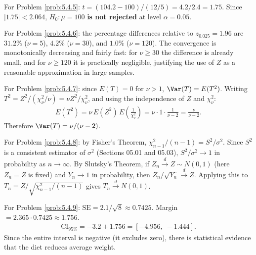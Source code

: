 \begin{solucion}
	\label{sol:5.4.5}
	For Problem \ref{prob:5.4.5}: $t = (104.2-100)/(12/5) = 4.2/2.4 = 1.75$. Since $|1.75| < 2.064$, $H_0:\mu=100$ \textbf{is not rejected} at level $\alpha=0.05$. \quad \qedhere
\end{solucion}

\begin{solucion}
	\label{sol:5.4.6}
	For Problem \ref{prob:5.4.6}: the percentage differences relative to $z_{0.025}=1.96$ are $31.2\%$ ($\nu=5$), $4.2\%$ ($\nu=30$), and $1.0\%$ ($\nu=120$). The convergence is monotonically decreasing and fairly fast: for $\nu\ge 30$ the difference is already small, and for $\nu\ge 120$ it is practically negligible, justifying the use of $Z$ as a reasonable approximation in large samples. \quad \qedhere
\end{solucion}

\begin{solucion}
	\label{sol:5.4.7}
	For Problem \ref{prob:5.4.7}: since $E(T)=0$ for $\nu>1$, $\Var(T)=E(T^2)$. Writing $T^2 = Z^2/(\chi^2_\nu/\nu) = \nu Z^2/\chi^2_\nu$, and using the independence of $Z$ and $\chi^2_\nu$:
	\begin{align*}
		E(T^2) = \nu\, E(Z^2)\, E\!\left(\frac{1}{\chi^2_\nu}\right) = \nu \cdot 1 \cdot \frac{1}{\nu-2} = \frac{\nu}{\nu-2}.
	\end{align*}
	Therefore $\Var(T) = \nu/(\nu-2)$. \quad \qedhere
\end{solucion}

\begin{solucion}
	\label{sol:5.4.8}
	For Problem \ref{prob:5.4.8}: by Fisher's Theorem, $\chi^2_{n-1}/(n-1) = S^2/\sigma^2$. Since $S^2$ is a consistent estimator of $\sigma^2$ (Sections 05.01 and 05.03), $S^2/\sigma^2 \to 1$ in probability as $n\to\infty$. By Slutsky's Theorem, if $Z_n \xrightarrow{d} Z\sim N(0,1)$ (here $Z_n=Z$ is fixed) and $Y_n\to 1$ in probability, then $Z_n/\sqrt{Y_n} \xrightarrow{d} Z$. Applying this to $T_n = Z/\sqrt{\chi^2_{n-1}/(n-1)}$ gives $T_n \xrightarrow{d} N(0,1)$. \quad \qedhere
\end{solucion}

\begin{solucion}
	\label{sol:5.4.9}
	For Problem \ref{prob:5.4.9}: $\text{SE} = 2.1/\sqrt8 \approx 0.7425$. Margin $=2.365\cdot 0.7425\approx 1.756$.
	\begin{align*}
		\text{CI}_{95\%} = -3.2 \pm 1.756 = [-4.956,\; -1.444].
	\end{align*}
	Since the entire interval is negative (it excludes zero), there is statistical evidence that the diet reduces average weight. \quad \qedhere
\end{solucion}

